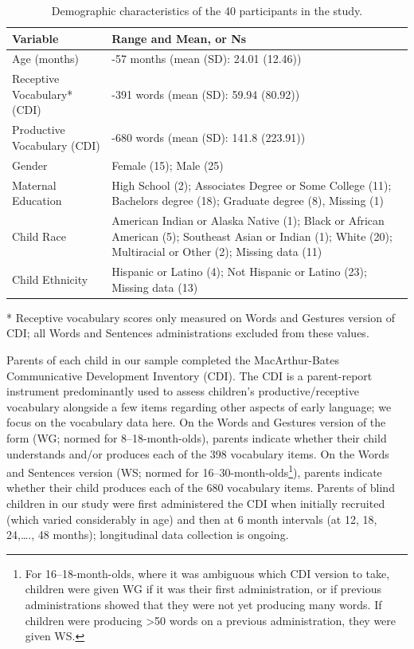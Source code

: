 \documentclass[
  man,floatsintext]{apa6}
\begin{document}
\begin{table}[H]

\begin{threeparttable}
\caption{\label{tab:demographics-table}Demographic characteristics of the 40 participants in the study.}
\centering
\begin{tabular}[t]{l|>{\raggedright\arraybackslash}p{4in}}
\hline
Variable & Range and Mean, or Ns\\
\hline
Age (months) & 7-57 months (mean (SD): 24.01 (12.46))\\
\hline
Receptive Vocabulary* (CDI) & 0-391 words (mean (SD): 59.94 (80.92))\\
\hline
Productive Vocabulary (CDI) & 0-680 words (mean (SD): 141.8 (223.91))\\
\hline
Gender & Female (15); Male (25)\\
\hline
Maternal Education & High School (2); Associates Degree or Some College (11); Bachelors degree (18); Graduate degree (8), Missing (1)\\
\hline
Child Race & American Indian or Alaska Native (1); Black or African American (5); Southeast Asian or Indian (1); White (20); Multiracial or Other (2); Missing data (11)\\
\hline
Child Ethnicity & Hispanic or Latino (4); Not Hispanic or Latino (23); Missing data (13)\\
\hline
\end{tabular}
\begin{tablenotes}
\small
\item [*] Receptive vocabulary scores only measured on Words and Gestures version of CDI; all Words and Sentences administrations excluded from these values.
\end{tablenotes}
\end{threeparttable}
\end{table}

Parents of each child in our sample completed the MacArthur-Bates Communicative Development Inventory (CDI). The CDI is a parent-report instrument predominantly used to assess children's productive/receptive vocabulary alongside a few items regarding other aspects of early language; we focus on the vocabulary data here. On the Words and Gestures version of the form (WG; normed for 8--18-month-olds), parents indicate whether their child understands and/or produces each of the 398 vocabulary items. On the Words and Sentences version (WS; normed for 16--30-month-olds\footnote{For 16--18-month-olds, where it was ambiguous which CDI version to take, children were given WG if it was their first administration, or if previous administrations showed that they were not yet producing many words. If children were producing \textgreater50 words on a previous administration, they were given WS.}), parents indicate whether their child produces each of the 680 vocabulary items. Parents of blind children in our study were first administered the CDI when initially recruited (which varied considerably in age) and then at 6 month intervals (at 12, 18, 24,\ldots., 48 months); longitudinal data collection is ongoing.
\end{document}
